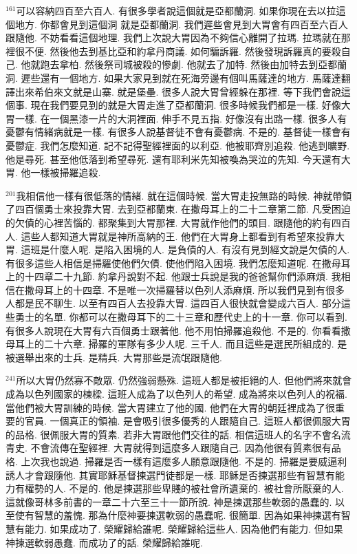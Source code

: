 \documentclass{book}
\begin{document}
$^{161}$可以容納四百至六百人.
有很多學者說這個就是亞都蘭洞.
如果你現在去以拉這個地方.
你都會見到這個洞 就是亞都蘭洞.
我們遲些會見到大胃會有四百至六百人跟隨他.
不妨看看這個地理.
我們上次說大胃因為不夠信心離開了拉瑪.
拉瑪就在那裡很不便.
然後他去到基比亞和約拿丹商議.
如何騙訴羅.
然後發現訴羅真的要殺自己.
他就跑去拿柏.
然後祭司城被殺的慘劇.
他就去了加特.
然後由加特去到亞都蘭洞.
遲些還有一個地方.
如果大家見到就在死海旁邊有個叫馬薩達的地方.
馬薩達翻譯出來希伯來文就是山寨.
就是堡壘.
很多人說大胃曾經躲在那裡.
等下我們會說這個事.
現在我們要見到的就是大胃走進了亞都蘭洞.
很多時候我們都是一樣.
好像大胃一樣.
在一個黑漆一片的大洞裡面.
伸手不見五指.
好像沒有出路一樣.
很多人有憂鬱有情緒病就是一樣.
有很多人說基督徒不會有憂鬱病.
不是的.
基督徒一樣會有憂鬱症.
我們怎麼知道.
記不記得聖經裡面的以利亞.
他被耶齊別追殺.
他逃到曠野.
他是尋死.
甚至他低落到希望尋死.
還有耶利米先知被喚為哭泣的先知.
今天還有大胃.
他一樣被掃羅追殺.

$^{201}$我相信他一樣有很低落的情緒.
就在這個時候.
當大胃走投無路的時候.
神就帶領了四百個勇士來投靠大胃.
去到亞都蘭東.
在撒母耳上的二十二章第二節.
凡受困迫的欠債的心裡苦惱的.
都聚集到大胃那裡.
大胃就作他們的頭目.
跟隨他的約有四百人.
這些人都知道大胃就是神所高納的王.
他們在大胃身上都看到有希望來投靠大胃.
這班是什麼人呢.
是陷入困境的人.
是負債的人.
有沒有見到經文說是欠債的人.
有很多這些人相信是掃羅使他們欠債.
使他們陷入困境.
我們怎麼知道呢.
在撒母耳上的十四章二十九節.
約拿丹說對不起.
他跟士兵說是我的爸爸幫你們添麻煩.
我相信在撒母耳上的十四章.
不是唯一次掃羅替以色列人添麻煩.
所以我們見到有很多人都是民不聊生.
以至有四百人去投靠大胃.
這四百人很快就會變成六百人.
部分這些勇士的名單.
你都可以在撒母耳下的二十三章和歷代史上的十一章.
你可以看到.
有很多人說現在大胃有六百個勇士跟著他.
他不用怕掃羅追殺他.
不是的.
你看看撒母耳上的二十六章.
掃羅的軍隊有多少人呢.
三千人.
而且這些是選民所組成的.
是被選舉出來的士兵.
是精兵.
大胃那些是流氓跟隨他.

$^{241}$所以大胃仍然寡不敵眾.
仍然強弱懸殊.
這班人都是被拒絕的人.
但他們將來就會成為以色列國家的棟樑.
這班人成為了以色列人的希望.
成為將來以色列人的祝福.
當他們被大胃訓練的時候.
當大胃建立了他的國.
他們在大胃的朝廷裡成為了很重要的官員.
一個真正的領袖.
是會吸引很多優秀的人跟隨自己.
這班人都很佩服大胃的品格.
很佩服大胃的質素.
若非大胃跟他們交往的話.
相信這班人的名字不會名流青史.
不會流傳在聖經裡.
大胃就得到這麼多人跟隨自己.
因為他很有質素很有品格.
上次我也說過.
掃羅是否一樣有這麼多人願意跟隨他.
不是的.
掃羅是要威逼利誘人才會跟隨他.
其實耶穌基督揀選門徒都是一樣.
耶穌是否揀選那些有智慧有能力有權勢的人.
不是的.
他是揀選那些卑賤的被社會所遺棄的.
被社會所厭棄的人.
這就像哥林多前書的一章二十六至三十一節所說.
神是揀選那些軟弱的愚蠢的.
以至使有智慧的羞愧.
那為什麼神要揀選軟弱的愚蠢呢.
很簡單.
因為如果神揀選有智慧有能力.
如果成功了.
榮耀歸給誰呢.
榮耀歸給這些人.
因為他們有能力.
但如果神揀選軟弱愚蠢.
而成功了的話.
榮耀歸給誰呢.
\end{document}

